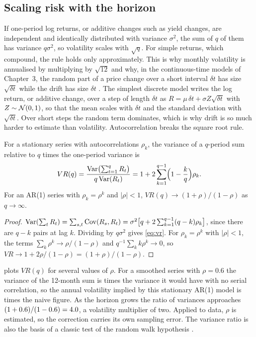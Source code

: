\begin{chapterrefs}
\subsection{Scaling risk with the horizon}

If one-period log returns, or additive changes such as yield changes, are independent and identically
distributed with variance $\sigma^2$, the sum of $q$ of them has variance $q\sigma^2$, so volatility
scales with $\sqrt q$. For simple returns, which compound, the rule holds only approximately. This is why monthly volatility is
annualised by multiplying by $\sqrt{12}$ and why, in the continuous-time models of Chapter~3, the
random part of a price change over a short interval $\delta t$ has size $\sqrt{\delta t}$ while the drift
has size $\delta t$ \parencite{wilmott2006}. The simplest discrete model writes the log return, or additive change, over a step of length
$\delta t$ as $R = \mu\,\delta t + \sigma Z\sqrt{\delta t}$ with $Z\sim\mathcal{N}(0,1)$, so that
the mean scales with $\delta t$ and the standard deviation with $\sqrt{\delta t}$. Over short steps the random
term dominates, which is why drift is so much harder to estimate than volatility. Autocorrelation breaks
the square root rule.

\begin{proposition}\label{prop:vr}
For a stationary series with autocorrelations $\rho_k$, the variance of a $q$-period sum relative to $q$
times the one-period variance is
\begin{equation}\label{eq:vr}
  VR(q) = \frac{\operatorname{Var}\bigl(\sum_{t=1}^q R_t\bigr)}{q\operatorname{Var}(R_t)} = 1 + 2\sum_{k=1}^{q-1}\Bigl(1-\frac kq\Bigr)\rho_k .
\end{equation}
For an AR(1) series with $\rho_k = \rho^k$ and $|\rho|<1$, $VR(q)\to(1+\rho)/(1-\rho)$ as $q\to\infty$.
\end{proposition}
\begin{proof}
$\operatorname{Var}(\sum_t R_t) = \sum_{s,t}\operatorname{Cov}(R_s,R_t) = \sigma^2\bigl[q + 2\sum_{k=1}^{q-1}(q-k)\rho_k\bigr]$, since
there are $q-k$ pairs at lag $k$. Dividing by $q\sigma^2$ gives \cref{eq:vr}. For $\rho_k=\rho^k$ with $|\rho|<1$, the terms
$\sum_k \rho^k \to \rho/(1-\rho)$ and $q^{-1}\sum_k k\rho^k \to 0$, so $VR \to 1 + 2\rho/(1-\rho) = (1+\rho)/(1-\rho)$.
\end{proof}

 plots $VR(q)$ for several values of $\rho$. For a smoothed series with $\rho = 0.6$ the variance of the 12-month sum is \vrTwelveSix{} times the variance it would have with no serial
correlation,
so the annual volatility implied by this stationary AR(1) model is \vrTwelveSixSqrt{} times the naive
figure. As the horizon grows the ratio of variances approaches $(1+0.6)/(1-0.6)=4.0$, a
volatility multiplier of two. Applied to data, $\rho$ is estimated, so the correction carries its own
sampling error. The variance ratio is also the basis of a classic test of the random walk
hypothesis \parencite{lo1988}.


\end{chapterrefs}

